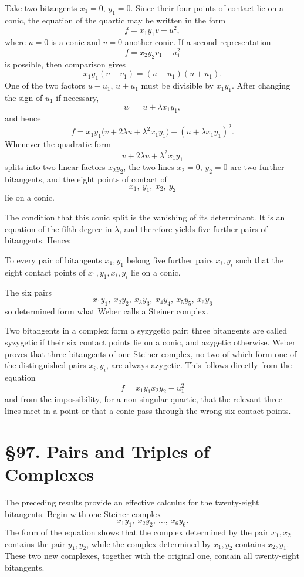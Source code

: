\documentclass[11pt,a4paper]{book}
\newcommand{\webersection}[2]{\clearpage\section*{\S #1. #2}}
\begin{document}
Take two bitangents \(x_1=0\), \(y_1=0\).  Since their four points of contact lie on a conic, the equation of the quartic may be written in the form
\[
f=x_1y_1v-u^2,
\]
where \(u=0\) is a conic and \(v=0\) another conic.  If a second representation
\[
f=x_2y_2v_1-u_1^2
\]
is possible, then comparison gives
\[
x_1y_1(v-v_1)=(u-u_1)(u+u_1).
\]
One of the two factors \(u-u_1\), \(u+u_1\) must be divisible by \(x_1y_1\).  After changing the sign of \(u_1\) if necessary,
\[
u_1=u+\lambda x_1y_1,
\]
and hence
\[
f=x_1y_1\bigl(v+2\lambda u+\lambda^2x_1y_1\bigr)
  -(u+\lambda x_1y_1)^2.
\]
Whenever the quadratic form
\[
v+2\lambda u+\lambda^2x_1y_1
\]
splits into two linear factors \(x_2y_2\), the two lines \(x_2=0\), \(y_2=0\) are two further bitangents, and the eight points of contact of
\[
x_1,\ y_1,\ x_2,\ y_2
\]
lie on a conic.

The condition that this conic split is the vanishing of its determinant.  It is an equation of the fifth degree in \(\lambda\), and therefore yields five further pairs of bitangents.  Hence:

To every pair of bitangents \(x_1,y_1\) belong five further pairs \(x_i,y_i\) such that the eight contact points of \(x_1,y_1,x_i,y_i\) lie on a conic.

The six pairs
\[
x_1y_1,\ x_2y_2,\ x_3y_3,\ x_4y_4,\ x_5y_5,\ x_6y_6
\]
so determined form what Weber calls a Steiner complex.

Two bitangents in a complex form a syzygetic pair; three bitangents are called syzygetic if their six contact points lie on a conic, and azygetic otherwise.  Weber proves that three bitangents of one Steiner complex, no two of which form one of the distinguished pairs \(x_i,y_i\), are always azygetic.  This follows directly from the equation
\[
f=x_1y_1x_2y_2-u_1^2
\]
and from the impossibility, for a non-singular quartic, that the relevant three lines meet in a point or that a conic pass through the wrong six contact points.

\webersection{97}{Pairs and Triples of Complexes}

The preceding results provide an effective calculus for the twenty-eight bitangents.  Begin with one Steiner complex
\[
x_1y_1,\ x_2y_2,\ \dots,\ x_6y_6.
\]
The form of the equation shows that the complex determined by the pair \(x_1,x_2\) contains the pair \(y_1,y_2\), while the complex determined by \(x_1,y_2\) contains \(x_2,y_1\).  These two new complexes, together with the original one, contain all twenty-eight bitangents.
\end{document}
